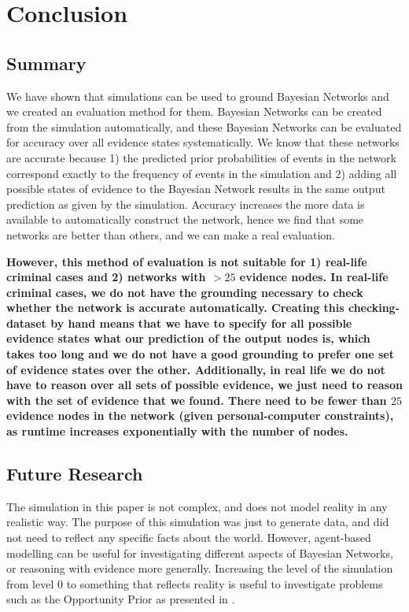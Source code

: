 \documentclass[12pt]{article}
\begin{document}
\section{Conclusion}

\subsection{Summary}
We have shown that simulations can be used to ground Bayesian Networks and we created an evaluation method for them. Bayesian Networks can be created from the simulation automatically, and these Bayesian Networks can be evaluated for accuracy over all evidence states systematically. We know that these networks are accurate because 1) the predicted prior probabilities of events in the network correspond exactly to the frequency of events in the simulation and 2) adding all possible states of evidence to the Bayesian Network results in the same output prediction as given by the simulation. Accuracy increases the more data is available to automatically construct the network, hence we find that some networks are better than others, and we can make a real evaluation.

 \textbf{However, this method of evaluation is not suitable for 1) real-life criminal cases and 2) networks with $> 25$ evidence nodes. In real-life criminal cases, we do not have the grounding necessary to check whether the network is accurate automatically. Creating this checking-dataset by hand means that we have to specify for all possible evidence states what our prediction of the output nodes is, which takes too long and we do not have a good grounding to prefer one set of evidence states over the other. Additionally, in real life we do not have to reason over all sets of possible evidence, we just need to reason with the set of evidence that we found. There need to be fewer than $25$ evidence nodes in the network (given personal-computer constraints), as runtime increases exponentially with the number of nodes.}

 
\subsection{Future Research}

The simulation in this paper is not complex, and does not model reality in any realistic way. The purpose of this simulation was just to generate data, and did not need to reflect any specific facts about the world. However, agent-based modelling can be useful for investigating different aspects of Bayesian Networks, or reasoning with evidence more generally. Increasing the level of the simulation from level 0 to something that reflects reality is useful to investigate problems such as the Opportunity Prior as presented in \citet{Fenton2017}. 
\end{document}
